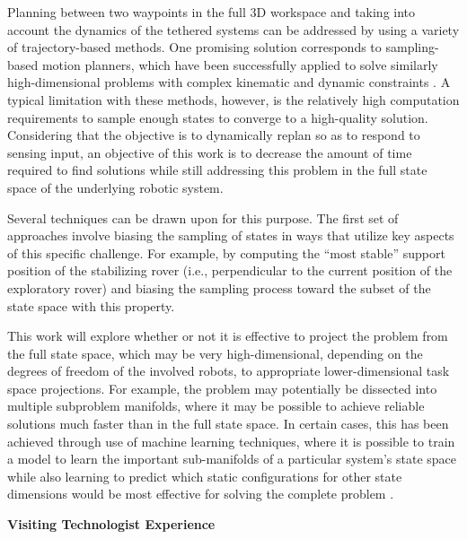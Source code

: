 \documentclass[12pt]{article}
\newcommand{\kostas}[1]{{\color{blue} #1}}
\begin{document}

Planning between two waypoints in the full 3D workspace and taking
into account the dynamics of the tethered systems can be addressed by
using a variety of trajectory-based methods. One promising solution
corresponds to sampling-based motion planners, which have been
successfully applied to solve similarly high-dimensional problems with
complex kinematic and dynamic constraints \cite{zak_kino}. A typical
limitation with these methods, however, is the relatively high
computation requirements to sample enough states to converge to a
high-quality solution. Considering that the objective is to
dynamically replan so as to respond to sensing input, an objective of
this work is to decrease the amount of time required to find solutions
while still addressing this problem in the full state space of the
underlying robotic system.


Several techniques can be drawn upon for this purpose. The first set
of approaches involve biasing the sampling of states in ways that
utilize key aspects of this specific challenge. For example, by
computing the ``most stable'' support position of the stabilizing
rover (i.e., perpendicular to the current position of the exploratory
rover) and biasing the sampling process toward the subset of the state
space with this property. 

This work will explore whether or not it
is effective to project the problem from the full state space, which
may be very high-dimensional, depending on the degrees of freedom of
the involved robots, to appropriate lower-dimensional task space
projections. For example, the problem may potentially be dissected 
into multiple subproblem
manifolds, where it may be possible to achieve reliable solutions much
faster than in the full state space. In certain cases, this has been
achieved through use of machine learning techniques, where it is
possible to train a model to learn the important sub-manifolds of a
particular system's state space while also learning to predict which
static configurations for other state dimensions would be most
effective for solving the complete problem \cite{learning_biases}.


{\bf\noindent Visiting Technologist Experience}
\end{document}
